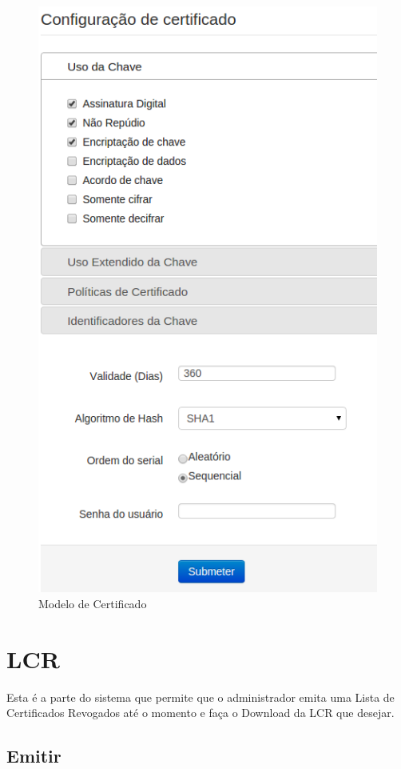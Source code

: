 \begin{figure}[ht]
     \centering
     \includegraphics[scale=0.5]{images/modelocert.png}
     \caption{Modelo de Certificado}
     \label{fig:modelocert}
\end{figure}

\section{LCR}

Esta é a parte do sistema que permite que o administrador emita uma Lista de Certificados Revogados até o momento e faça o Download da LCR que desejar.

\subsection{Emitir}

